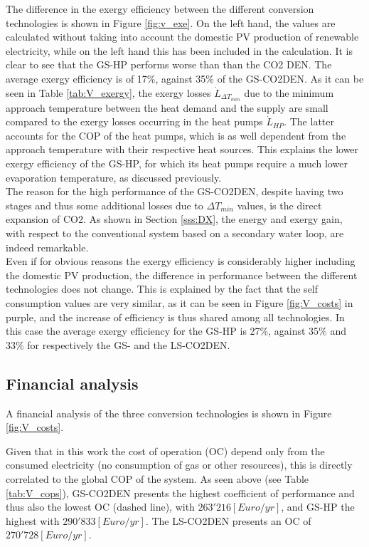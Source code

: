\documentclass{article}
\begin{document}
The difference in the exergy efficiency between the different conversion technologies is shown in Figure \ref{fig:v_exe}. On the left hand, the values are calculated without taking into account the domestic PV production of renewable electricity, while on the left hand this has been included in the calculation. It is clear to see that the GS-HP performs worse than than the CO2 DEN. The average exergy efficiency is of 17\%, against 35\% of the GS-CO2DEN. As it can be seen in Table \ref{tab:V_exergy}, the exergy losses $\dot{L}_{\Delta T_{min}}$ due to the minimum approach temperature between the heat demand and the supply are small compared to the exergy losses occurring in the heat pumps $\dot{L}_{HP}$. The latter accounts for the COP of the heat pumps, which is as well dependent from the approach temperature with their respective heat sources. This explains the lower exergy efficiency of the GS-HP, for which its heat pumps require a much lower evaporation temperature, as discussed previously.\\



The reason for the high performance of the GS-CO2DEN, despite having two stages and thus some additional losses due to $\Delta T_{min}$ values, is the direct expansion of CO2. As shown in Section \ref{sss:DX}, the energy and exergy gain, with respect to the conventional system based on a secondary water loop, are indeed remarkable.\\

Even if for obvious reasons the exergy efficiency is considerably higher including the domestic PV production, the difference in performance between the different technologies does not change. This is explained by the fact that the self consumption values are very similar, as it can be seen in Figure \ref{fig:V_costs} in purple, and the increase of efficiency is thus shared among all technologies. In this case the average exergy efficiency for the GS-HP is 27\%, against 35\% and 33\% for respectively the GS- and the LS-CO2DEN.


\subsection{Financial analysis}

A financial analysis of the three conversion technologies is shown in Figure \ref{fig:V_costs}. 

Given that in this work the cost of operation (OC) depend only from the consumed electricity (no consumption of gas or other resources), this is directly correlated to the global COP of the system. As seen above (see Table \ref{tab:V_cops}), GS-CO2DEN presents the highest coefficient of performance and thus also the lowest OC (dashed line), with $263'216[Euro/yr]$, and GS-HP the highest with $290'833[Euro/yr]$. The LS-CO2DEN presents an OC of $270'728[Euro/yr]$.\\
\end{document}
